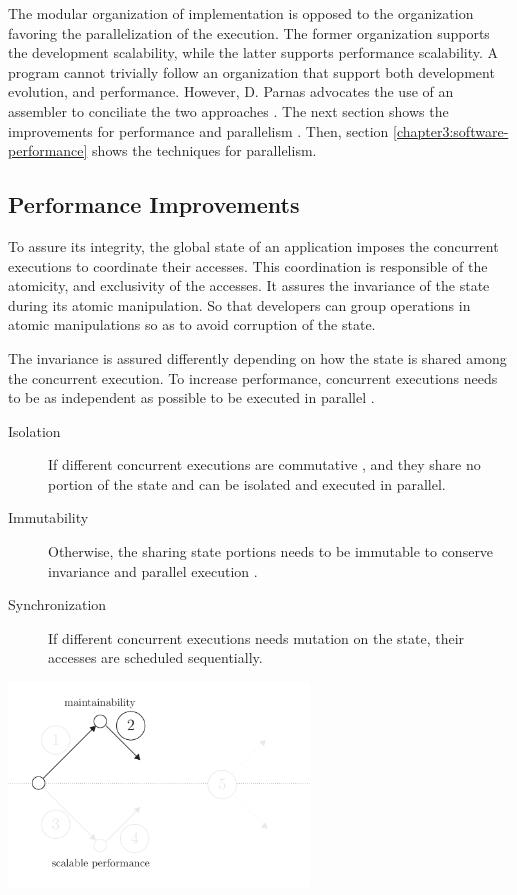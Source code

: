 The modular organization of implementation is opposed to the organization favoring the parallelization of the execution.
The former organization supports the development scalability, while the latter supports performance scalability.
A program cannot trivially follow an organization that support both development evolution, and performance.
However, D. Parnas advocates the use of an assembler to conciliate the two approaches \cite{Parnas1972}.
The next section shows the improvements for performance and parallelism .
Then, section \ref{chapter3:software-performance} shows the techniques for parallelism.

\subsection{Performance Improvements} \label{chapter3:software-maintainability:performance}

To assure its integrity, the global state of an application imposes the concurrent executions to coordinate their accesses.
This coordination is responsible of the atomicity, and exclusivity of the accesses.
It assures the invariance of the state during its atomic manipulation.
So that developers can group operations in atomic manipulations so as to avoid corruption of the state.

The invariance is assured differently depending on how the state is shared among the concurrent execution.
To increase performance, concurrent executions needs to be as independent as possible to be executed in parallel .
\begin{description}
  \item[Isolation] If different concurrent executions are commutative \cite{Rinard1996,Clements2013a}, and they share no portion of the state and can be isolated and executed in parallel.
  \item[Immutability] Otherwise, the sharing state portions needs to be immutable to conserve invariance and parallel execution \cite{Gordon2012,Matsakis2012a}.
  \item[Synchronization] If different concurrent executions needs mutation on the state, their accesses are scheduled sequentially.
\end{description}

\begin{center}
\includegraphics[width=0.6\textwidth]{../ressources/state-of-the-art-2.pdf}
\end{center}

